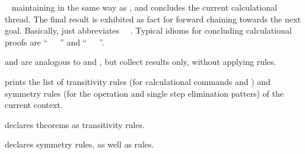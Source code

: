 \begin{isabellebody}
\begin{isamarkuptext}
\begin{descr}
  \item [\hyperlink{command.finally}{\mbox{\isa{\isacommand{finally}}}}~\isa{{\isachardoublequote}{\isacharparenleft}a\isactrlsub {\isadigit{1}}\ {\isasymdots}\ a\isactrlsub n{\isacharparenright}{\isachardoublequote}}]
  maintaining \hyperlink{fact.calculation}{\mbox{}} in the same way as \hyperlink{command.also}{\mbox{}}, and concludes the current calculational thread.  The final
  result is exhibited as fact for forward chaining towards the next
  goal. Basically, \hyperlink{command.finally}{\mbox{}} just abbreviates \hyperlink{command.also}{\mbox{}}~\hyperlink{command.from}{\mbox{}}~\hyperlink{fact.calculation}{\mbox{}}.  Typical idioms for
  concluding calculational proofs are ``\hyperlink{command.finally}{\mbox{}}~\hyperlink{command.show}{\mbox{}}~~\hyperlink{command.dot}{\mbox{\isa{\isacommand{{\isachardot}}}}}'' and ``\hyperlink{command.finally}{\mbox{}}~\hyperlink{command.have}{\mbox{}}~\isa{{\isasymphi}}~\hyperlink{command.dot}{\mbox{\isa{\isacommand{{\isachardot}}}}}''.

  \item [\hyperlink{command.moreover}{\mbox{\isa{\isacommand{moreover}}}} and \hyperlink{command.ultimately}{\mbox{\isa{\isacommand{ultimately}}}}] are
  analogous to \hyperlink{command.also}{\mbox{}} and \hyperlink{command.finally}{\mbox{}}, but collect
  results only, without applying rules.

  \item [\hyperlink{command.print-trans-rules}{\mbox{\isa{\isacommand{print{\isacharunderscore}trans{\isacharunderscore}rules}}}}] prints the list of
  transitivity rules (for calculational commands \hyperlink{command.also}{\mbox{}} and
  \hyperlink{command.finally}{\mbox{}}) and symmetry rules (for the \hyperlink{attribute.symmetric}{\mbox{}} operation and single step elimination patters) of the
  current context.

  \item [\hyperlink{attribute.trans}{\mbox{\isa{trans}}}] declares theorems as transitivity rules.

  \item [\hyperlink{attribute.sym}{\mbox{\isa{sym}}}] declares symmetry rules, as well as
  \hyperlink{attribute.Pure.elim}{\mbox{}}\isa{{\isachardoublequote}{\isacharquery}{\isachardoublequote}} rules.


\end{descr}
\end{isamarkuptext}
\end{isabellebody}
